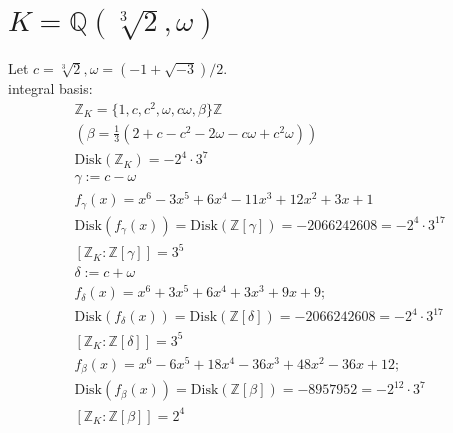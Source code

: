 \documentclass{jsarticle}
\newcommand{\Disk}{\mathrm{Disk}}
\begin{document}
\section{$K=\mathbb Q(\sqrt[3]2,\omega)$}
Let $c=\sqrt[3]2,\omega=(-1+\sqrt{-3})/2$.\\
integral basis:
\begin{align*}
\mathbb Z_K=\{1,c,c^2,\omega,c\omega,\beta\}\mathbb Z \\
(\beta=\frac 13(2+c-c^2-2\omega-c\omega+c^2\omega))\\
\Disk(\mathbb Z_K)=-2^4\cdot 3^7\\
\gamma:=c-\omega \\
f_\gamma(x)=x^6-3x^5+6x^4-11x^3+12x^2+3x+1\\
\Disk(f_\gamma(x))=\Disk(\mathbb Z[\gamma])=-2066242608=-2^4\cdot 3^{17}\\
[\mathbb Z_K : \mathbb Z[\gamma]]=3^5\\
\delta:=c+\omega\\
f_\delta(x)=x^6+3x^5+6x^4+3x^3+9x+9;\\
\Disk(f_\delta(x))=\Disk(\mathbb Z[\delta])=-2066242608=-2^4\cdot 3^{17}\\
[\mathbb Z_K : \mathbb Z[\delta]]=3^5\\
f_\beta(x)=x^6-6x^5+18x^4-36x^3+48x^2-36x+12;\\
\Disk(f_\beta(x))=\Disk(\mathbb Z[\beta])=-8957952=-2^{12}\cdot 3^7\\
[\mathbb Z_K : \mathbb Z[\beta]]=2^4\\
\end{align*}
\end{document}
